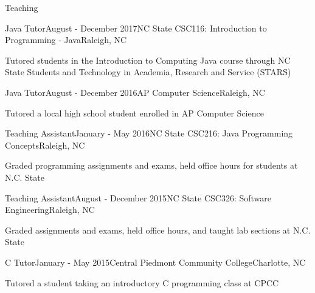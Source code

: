\documentclass{resume} %
\begin{document}

\begin{rSection}{Teaching}

\begin{rSubsection}{Java Tutor}{August - December 2017}{NC State CSC116: Introduction to Programming ‐ Java}{Raleigh, NC}
\item Tutored students in the Introduction to Computing Java course through NC State Students and Technology in Academia, Research and Service (STARS)
\end{rSubsection}


\begin{rSubsection}{Java Tutor}{August - December 2016}{AP Computer Science}{Raleigh, NC}
\item Tutored a local high school student enrolled in AP Computer Science 
\end{rSubsection}


\begin{rSubsection}{Teaching Assistant}{January - May 2016}{NC State CSC216: Java Programming Concepts}{Raleigh, NC}
\item Graded programming assignments and exams, held office hours for students  at N.C. State
\end{rSubsection}


\begin{rSubsection}{Teaching Assistant}{August - December 2015}{NC State CSC326: Software Engineering}{Raleigh, NC}
\item Graded assignments and exams, held office hours, and taught lab sections  at N.C. State
\end{rSubsection}


\begin{rSubsection}{C Tutor}{January - May 2015}{Central Piedmont Community College}{Charlotte, NC}
\item Tutored a student taking an introductory C programming class at CPCC
\end{rSubsection}


\end{rSection}
\end{document}
